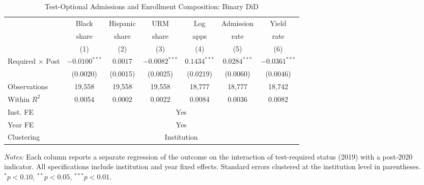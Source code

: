 \begin{table}[htbp]
\centering
\caption{Test-Optional Admissions and Enrollment Composition: Binary DiD}
\label{tab:main_binary}
\begin{adjustbox}{max width=\textwidth}
\begin{tabular}{lcccccc}
\hline\hline
 & Black & Hispanic & URM & Log & Admission & Yield \\
 & share & share & share & apps & rate & rate \\
 & (1) & (2) & (3) & (4) & (5) & (6) \\
\hline
Required $\times$ Post & $-0.0100^{***}$ & $0.0017$ & $-0.0082^{***}$ & $0.1434^{***}$ & $0.0284^{***}$ & $-0.0361^{***}$ \\
 & (0.0020) & (0.0015) & (0.0025) & (0.0219) & (0.0060) & (0.0046) \\
\hline
Observations & 19,558 & 19,558 & 19,558 & 18,777 & 18,777 & 18,742 \\
Within $R^2$ & 0.0054 & 0.0002 & 0.0022 & 0.0084 & 0.0036 & 0.0082 \\
Inst. FE & \multicolumn{6}{c}{Yes} \\
Year FE & \multicolumn{6}{c}{Yes} \\
Clustering & \multicolumn{6}{c}{Institution} \\
\hline\hline
\end{tabular}
\end{adjustbox}
\begin{tablenotes}[flushleft]
\small
\item \textit{Notes:} Each column reports a separate regression of the outcome on the interaction of test-required status (2019) with a post-2020 indicator. All specifications include institution and year fixed effects. Standard errors clustered at the institution level in parentheses. $^{*} p<0.10$, $^{**} p<0.05$, $^{***} p<0.01$.
\end{tablenotes}
\end{table}
